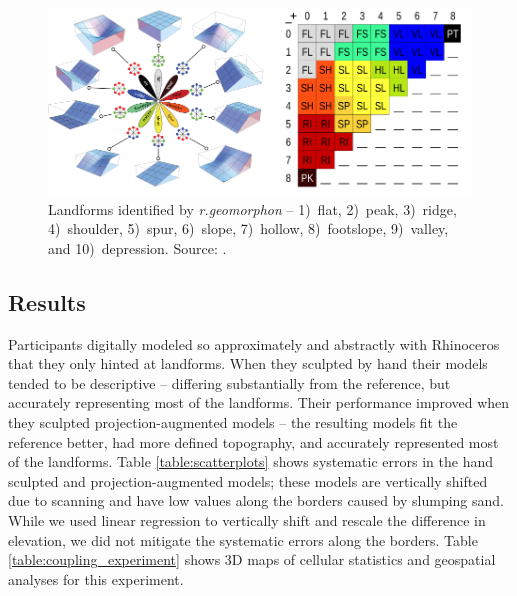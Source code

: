 \documentclass[prodmode,acmtochi]{acmsmall} %
\begin{document}
\begin{figure}
\begin{center}
		\includegraphics[width=\textwidth]{images/geomorphons_legend.png}
	\caption{Landforms identified by \textit{r.geomorphon} --
		1)~flat, 
		2)~peak, 
		3)~ridge, 
		4)~shoulder, 
		5)~spur, 
		6)~slope, 
		7)~hollow, 
		8)~footslope, 
		9)~valley, and
		10)~depression.
		Source: \cite{r.geomorphon}.}
	\label{fig:geomorphons}
\end{center}
\end{figure}

\subsection{Results}
%
Participants digitally modeled so approximately and abstractly 
with Rhinoceros
that they only hinted at landforms. %
%
When they sculpted by hand
their models tended to be descriptive -- 
differing substantially from the reference, but
accurately representing most of the landforms. 
%
Their performance improved 
when they sculpted projection-augmented models --
the resulting models
fit the reference better, 
had more defined topography, 
and accurately represented most of the landforms.
%
Table \ref{table:scatterplots} shows systematic errors
in the hand sculpted and projection-augmented models;
these models are vertically shifted due to scanning
and have low values along the borders
caused by slumping sand. 
While we used linear regression 
to vertically shift and rescale the difference in elevation, 
we did not mitigate the systematic errors
along the borders. 
%
Table \ref{table:coupling_experiment} shows 3D maps of cellular statistics 
and geospatial analyses for this experiment.

\end{document}
